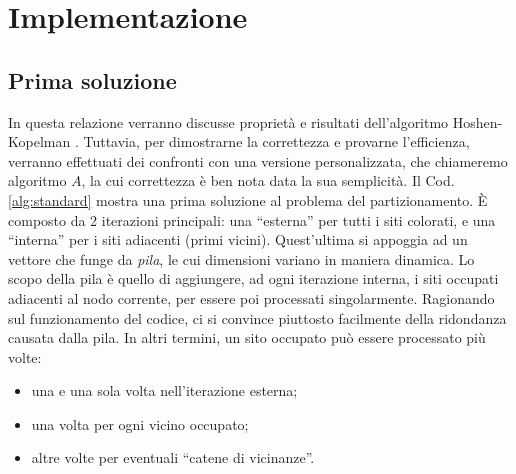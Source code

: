 \section{Implementazione}
\label{sec:implementazione}

\subsection*{Prima soluzione}

In questa relazione verranno discusse proprietà e risultati 
dell'algoritmo Hoshen-Kopelman \cite{Hoshen-Kopelman}.
Tuttavia, per dimostrarne la correttezza e provarne l'efficienza,
verranno effettuati dei confronti con una versione personalizzata,
che chiameremo algoritmo $A$,
la cui correttezza è ben nota data la sua semplicità.
Il Cod. \ref{alg:standard} mostra una prima soluzione 
al problema del partizionamento. È composto da 2 iterazioni principali: 
una ``esterna'' per tutti i siti colorati, e una ``interna'' per i siti 
adiacenti (primi vicini). Quest'ultima si appoggia ad un vettore che 
funge da \textit{pila}, le cui dimensioni variano in maniera dinamica.
Lo scopo della pila è quello di aggiungere, ad ogni iterazione interna, 
i siti occupati adiacenti al nodo corrente, per essere poi processati
singolarmente.
Ragionando sul funzionamento del codice, ci si convince piuttosto 
facilmente della ridondanza causata dalla pila. In altri termini,
un sito occupato può essere processato più volte:
\begin{itemize}
    \item una e una sola volta nell'iterazione esterna;
    \item una volta per ogni vicino occupato;
    \item altre volte per eventuali ``catene di vicinanze''.
\end{itemize}




